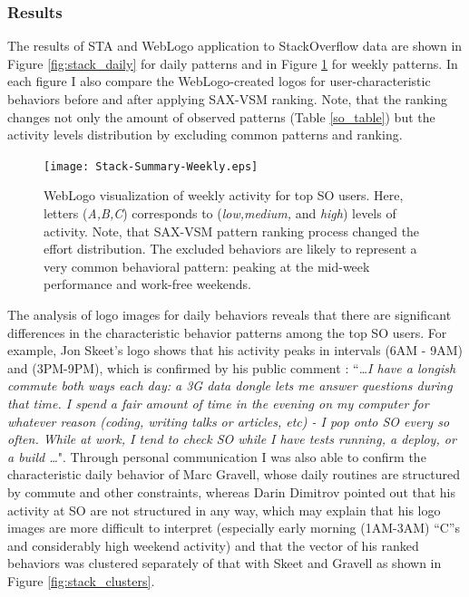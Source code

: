 \subsubsection{Results}
The results of STA and WebLogo application to StackOverflow data are shown in Figure \ref{fig:stack_daily} for daily patterns and in Figure \ref{fig:stack_weekly} for weekly patterns. In each figure I also compare the WebLogo-created logos for user-characteristic behaviors before and after applying SAX-VSM ranking. Note, that the ranking changes not only the amount of observed patterns (Table \ref{so_table}) but the activity levels distribution by excluding common patterns and ranking.

\begin{figure}[t]
   \centering
   \texttt{[image: Stack-Summary-Weekly.eps]}
   \caption[WebLogo visualization of weekly activity for top SO users.]{WebLogo visualization of weekly activity for top SO users. Here, letters (\textit{A,B,C}) corresponds to (\textit{low,medium,} and \textit{high}) levels of activity. Note, that SAX-VSM pattern ranking process changed the effort distribution. 
   The excluded behaviors are likely to represent a very common behavioral pattern: peaking at the mid-week performance and work-free weekends.}
   \label{fig:stack_weekly}   
\end{figure}

The analysis of logo images for daily behaviors reveals that there are significant differences in the characteristic behavior patterns among the top SO users. For example, Jon Skeet's logo shows that his activity peaks in intervals (6AM - 9AM) and (3PM-9PM), which is confirmed by his public comment \cite{skeet}: ``\textit{\dots I have a longish commute both ways each day: a 3G data dongle lets me answer questions during that time. I spend a fair amount of time in the evening on my computer for whatever reason (coding, writing talks or articles, etc) - I pop onto SO every so often. While at work, I tend to check SO while I have tests running, a deploy, or a build \dots}". Through personal communication I was also able to confirm the characteristic daily behavior of Marc Gravell, whose daily routines are structured by commute and other constraints, whereas Darin Dimitrov pointed out that his activity at SO are not structured in any way, which may explain that his logo images are more difficult to interpret (especially early morning (1AM-3AM) ``C''s and considerably high weekend activity) and that the vector of his ranked behaviors was clustered separately of that with Skeet and Gravell as shown in Figure \ref{fig:stack_clusters}.

